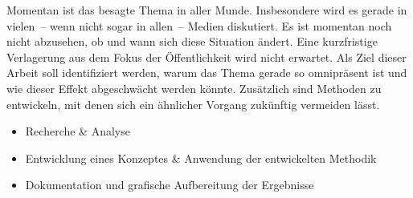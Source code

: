 


\begin{task}[] %
	\minisec{\objectivesname}\smallskip	
	Momentan ist das besagte Thema in aller Munde. Insbesondere wird es
	gerade in vielen~-- wenn nicht sogar in allen~-- Medien diskutiert.
	Es ist momentan noch nicht abzusehen, ob und wann sich diese
	Situation ändert. Eine kurzfristige Verlagerung aus dem Fokus
	der Öffentlichkeit wird nicht erwartet.
	Als Ziel dieser Arbeit soll identifiziert werden, warum das Thema
	gerade so omnipräsent ist und wie dieser Effekt abgeschwächt werden
	könnte. Zusätzlich sind Methoden zu entwickeln, mit denen sich ein
	ähnlicher Vorgang zukünftig vermeiden lässt.
	
	\minisec{\focusname}\smallskip
	\begin{itemize}
		\item Recherche \& Analyse
		\item Entwicklung eines Konzeptes \& Anwendung der entwickelten Methodik
		\item Dokumentation und grafische Aufbereitung der Ergebnisse
	\end{itemize}
\end{task}

